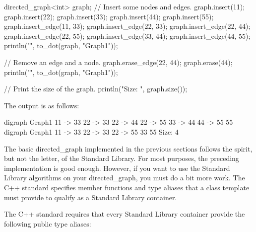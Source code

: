\begin{cpp}
directed_graph<int> graph;
// Insert some nodes and edges.
graph.insert(11);
graph.insert(22);
graph.insert(33);
graph.insert(44);
graph.insert(55);
graph.insert_edge(11, 33);
graph.insert_edge(22, 33);
graph.insert_edge(22, 44);
graph.insert_edge(22, 55);
graph.insert_edge(33, 44);
graph.insert_edge(44, 55);
println("{}", to_dot(graph, "Graph1"));

// Remove an edge and a node.
graph.erase_edge(22, 44);
graph.erase(44);
println("{}", to_dot(graph, "Graph1"));

// Print the size of the graph.
println("Size: {}", graph.size());
\end{cpp}

The output is as follows:

\begin{shell}
digraph Graph1 {
11 -> 33
22 -> 33
22 -> 44
22 -> 55
33 -> 44
44 -> 55
55
}
digraph Graph1 {
11 -> 33
22 -> 33
22 -> 55
33
55
}
Size: 4
\end{shell}


The basic directed\_graph implemented in the previous sections follows the spirit, but not the letter, of the Standard Library. For most purposes, the preceding implementation is good enough. However, if you want to use the Standard Library algorithms on your directed\_graph, you must do a bit more work. The C++ standard specifies member functions and type aliases that a class template must provide to qualify as a Standard Library container.


The C++ standard requires that every Standard Library container provide the following public type aliases:

